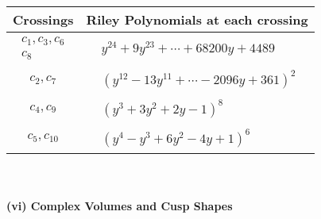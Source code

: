 \documentclass[1p]{elsarticle_modified}
\theoremstyle{definition}
\begin{document}
\begin{tabular}{m{50pt}|m{274pt}}
Crossings & \hspace{64pt}Riley Polynomials at each crossing \\
\hline $$\begin{aligned}c_{1},c_{3},c_{6}\\c_{8}\end{aligned}$$&$\begin{aligned}
&y^{24}+9 y^{23}+\cdots+68200 y+4489
\end{aligned}$\\
\hline $$\begin{aligned}c_{2},c_{7}\end{aligned}$$&$\begin{aligned}
&(y^{12}-13 y^{11}+\cdots-2096 y+361)^{2}
\end{aligned}$\\
\hline $$\begin{aligned}c_{4},c_{9}\end{aligned}$$&$\begin{aligned}
&(y^3+3 y^2+2 y-1)^8
\end{aligned}$\\
\hline $$\begin{aligned}c_{5},c_{10}\end{aligned}$$&$\begin{aligned}
&(y^4- y^3+6 y^2-4 y+1)^6
\end{aligned}$\\
\hline
\end{tabular}\\~\\
\newpage\flushleft \textbf{(vi) Complex Volumes and Cusp Shapes}
\end{document}
